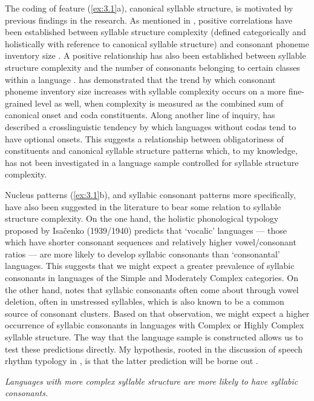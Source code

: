   The coding of feature (\ref{ex:3.1}a), canonical syllable structure, is motivated by previous findings in the research. As mentioned in , positive correlations have been established between syllable structure complexity (defined categorically and holistically with reference to canonical syllable structure) and consonant phoneme inventory size \citep{Maddieson2013a}. A positive relationship has also been established between syllable structure complexity and the number of consonants belonging to certain classes within a language \citep{MaddiesonEtAl2013}. \citet{Gordon2016} has demonstrated that the trend by which consonant phoneme inventory size increases with syllable complexity occurs on a more fine-grained level as well, when complexity is measured as the combined sum of canonical onset and coda constituents. Along another line of inquiry, \citet[336]{Blevins2006} has described a crosslinguistic tendency by which languages without codas tend to have optional onsets. This suggests a relationship between obligatoriness of constituents and canonical syllable structure patterns which, to my knowledge, has not been investigated in a language sample controlled for syllable structure complexity.

  Nucleus patterns (\ref{ex:3.1}b), and syllabic consonant patterns more specifically, have also been suggested in the literature to bear some relation to syllable structure complexity. On the one hand, the holistic phonological typology proposed by Isačenko (1939/1940) predicts that ‘vocalic’ languages — those which have shorter consonant sequences and relatively higher vowel/consonant ratios — are more likely to develop syllabic consonants than ‘consonantal’ languages. This suggests that we might expect a greater prevalence of syllabic consonants in languages of the Simple and Moderately Complex categories. On the other hand, \citet{Bell1978a} notes that syllabic consonants often come about through vowel deletion, often in unstressed syllables, which is also known to be a common source of consonant clusters. Based on that observation, we might expect a higher occurrence of syllabic consonants in languages with Complex or Highly Complex syllable structure. The way that the language sample is constructed allows us to test these predictions directly. My hypothesis, rooted in the discussion of speech rhythm typology in , is that the latter prediction will be borne out .

\ea\label{ex:3.3}
   \textit{Languages with more complex syllable structure are more likely to have syllabic consonants.}
\z

